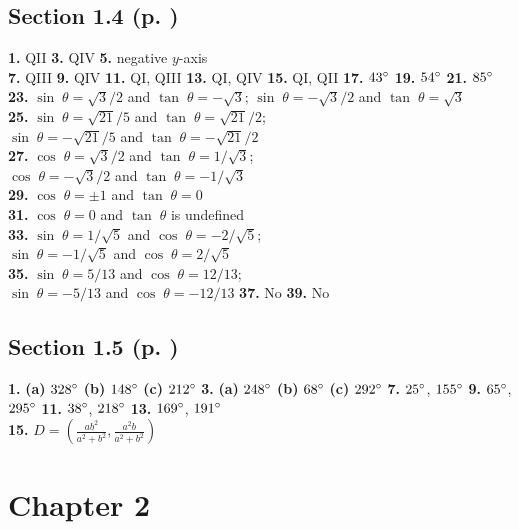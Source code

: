 \begin{multicols}{2}
\subsection*{Section 1.4 (p. \pageref{sec1dot4})}
\textbf{1.} QII \quad \textbf{3.} QIV \quad \textbf{5.} negative $y$-axis\\\textbf{7.} QIII
\quad \textbf{9.} QIV \quad \textbf{11.} QI, QIII \quad \textbf{13.} QI, QIV \quad
\textbf{15.} QI, QII \quad \textbf{17.} $43^\circ$ \quad \textbf{19.} $54^\circ$ \quad
\textbf{21.} $85^\circ$ \quad \textbf{23.} $\sin\;\theta = \sqrt{3}/2$ and $\tan\;\theta =
-\sqrt{3}$; $\sin\;\theta = -\sqrt{3}/2$ and $\tan\;\theta = \sqrt{3}$\\\textbf{25.}
$\sin\;\theta = \sqrt{21}/5$ and $\tan\;\theta = \sqrt{21}/2$;\\$\sin\;\theta = -\sqrt{21}/5$ and
$\tan\;\theta = -\sqrt{21}/2$\\\textbf{27.} $\cos\;\theta = \sqrt{3}/2$ and $\tan\;\theta =
1/\sqrt{3}$;\\$\cos\;\theta = -\sqrt{3}/2$ and $\tan\;\theta = -1/\sqrt{3}$\\
\textbf{29.} $\cos\;\theta = \pm 1$ and $\tan\;\theta = 0$\\\textbf{31.} $\cos\;\theta = 0$
and $\tan\;\theta$ is undefined\\\textbf{33.} $\sin\;\theta = 1/\sqrt{5}$ and
$\cos\;\theta = -2/\sqrt{5}$;\\$\sin\;\theta = -1/\sqrt{5}$ and $\cos\;\theta =
2/\sqrt{5}$\\\textbf{35.} $\sin\;\theta = 5/13$ and
$\cos\;\theta = 12/13$;\\$\sin\;\theta = -5/13$ and $\cos\;\theta =
-12/13$ \quad \textbf{37.} No \quad \textbf{39.} No
\subsection*{Section 1.5 (p. \pageref{sec1dot5})}
\textbf{1.} \textbf{(a)} $328^\circ$ \textbf{(b)} $148^\circ$ \textbf{(c)} $212^\circ$ \quad
\textbf{3.} \textbf{(a)} $248^\circ$ \textbf{(b)} $68^\circ$ \textbf{(c)} $292^\circ$ \quad
\textbf{7.} $25^\circ$, $155^\circ$ \quad \textbf{9.} $65^\circ$, $295^\circ$ \quad
\textbf{11.} $38^\circ$, $218^\circ$ \quad \textbf{13.} $169^\circ$,
$191^\circ$\\\textbf{15.} $D=\left( \frac{ab^2}{a^2 + b^2}, \frac{a^2 b}{a^2 + b^2} \right)$
\section*{Chapter 2}

\end{multicols}
